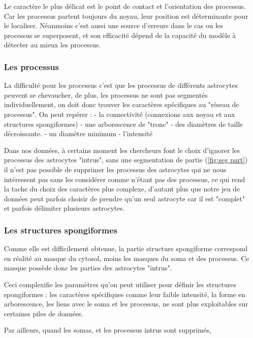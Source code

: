 \documentclass[7pt]{scrartcl}
\begin{document}
Le caractère le plus délicat est le point de contact et l'orientation des processus. Car les processus partent toujours du noyau, leur position est déterminante pour le localiser. Néanmoins c'est aussi une source d'erreurs dans le cas ou les processus se superposent, et son efficacité dépend de la capacité du modèle à détecter au mieux les processus. 

\subsubsection{Les processus}

La difficulté pour les processus c'est que les processus de différents astrocytes peuvent se chevaucher, de plus, les processus ne sont pas segmentés individuellement, on doit donc trouver les caractères spécifiques au "réseau de processus". 
On peut repérer : 
- la connectivité (connexions aux noyau et aux structures spongiformes) 
- une arborescence de "tronc"
- des diamètres de taille décroissante.
- un diamètre minimum
- l'intensité 

Dans nos données, à certains moment les chercheurs font le choix d'ignorer les processus des astrocytes "intrus", sans une segmentation de partie (\ref{fig:seg part}) il n'est pas possible de supprimer les processus des astrocytes qui ne nous intéressent pas sans les considérer comme n'étant pas des processus, ce qui rend la tache du choix des caractères plus complexe, d'autant plus que notre jeu de données peut parfois choisir de prendre qu'un seul astrocyte car il est "complet" et parfois délimiter plusieurs astrocytes.

\subsubsection{Les structures spongiformes}
Comme elle est difficilement obtenue, la partie structure spongiforme correspond en réalité au masque du cytosol, moins les masques du soma et des processus. 
Ce masque possède donc les parties des astrocytes "intrus".

Ceci complexifie les paramètres qu'on peut utiliser pour définir les structures spongiformes :
les caractères spécifiques comme
leur faible intensité,
la forme en arborescence,
les liens avec le soma et les processus,
ne sont plus exploitables sur certaines piles de données. 


Par ailleurs, quand les somas, et les processus intrus sont supprimés, 
\end{document}
